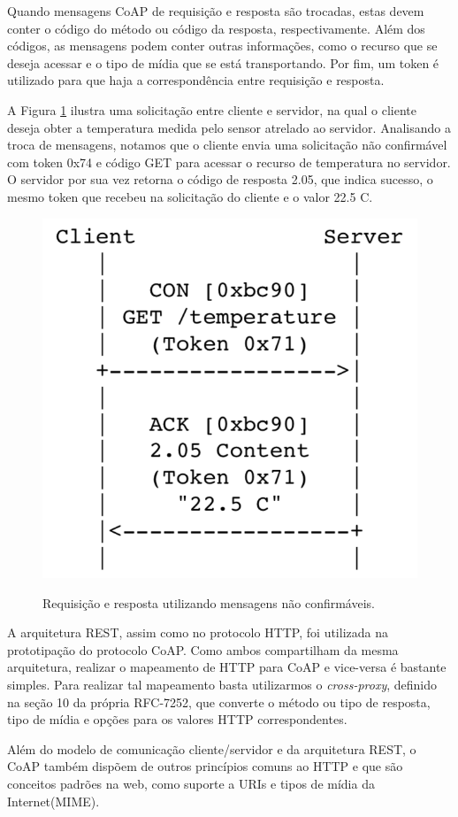 Quando mensagens CoAP de requisição e resposta são trocadas, estas devem conter o código do método ou código da resposta, respectivamente.
Além dos códigos, as mensagens podem conter outras informações, como o recurso que se deseja acessar e o tipo de mídia que se está transportando.
Por fim, um token é utilizado para que haja a correspondência entre requisição e resposta.

A Figura \ref{fig:fig4} ilustra uma solicitação entre cliente e servidor, na qual o cliente deseja obter a temperatura medida pelo sensor atrelado ao servidor.
Analisando a troca de mensagens, notamos que o cliente envia uma solicitação não confirmável com token 0x74 e código GET para acessar o recurso de temperatura no servidor.
O servidor por sua vez retorna o código de resposta 2.05, que indica sucesso, o mesmo token que recebeu na solicitação do cliente e o valor 22.5 C.

\begin{figure}[htb!]
    \centering\includegraphics[height=.4\textwidth]{fig4.png} 
    \caption [Requisição e resposta utilizando mensagens não confirmáveis]
    {\label{fig:fig4} Requisição e resposta utilizando mensagens não confirmáveis.} \cite{rfc7252}
\end{figure}

A arquitetura REST, assim como no protocolo HTTP\cite{rfc2616}, foi utilizada na prototipação do protocolo CoAP.
Como ambos compartilham da mesma arquitetura, realizar o mapeamento de HTTP para CoAP e vice-versa é bastante simples.
Para realizar tal mapeamento basta utilizarmos o \textit{cross-proxy}, definido na seção 10 da própria RFC-7252\cite{rfc7252},
que converte o método ou tipo de resposta, tipo de mídia e opções para os valores HTTP correspondentes.

Além do modelo de comunicação cliente/servidor e da arquitetura REST, o CoAP também dispõem de outros princípios comuns ao HTTP e que são conceitos padrões na web,
como suporte a URIs\cite{rfc3986} e tipos de mídia da Internet(MIME)\cite{rfc2046}.

